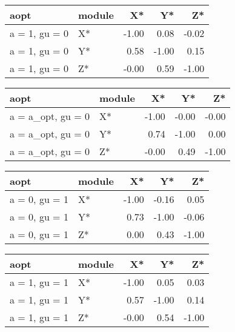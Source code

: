 \documentclass[10pt,a4paper]{article}
\begin{document}
\begin{table}[ht]
\centering
\begin{tabular}{llrrr}
  \hline
aopt & module & X* & Y* & Z* \\ 
  \hline
a = 1, gu = 0 & X* & -1.00 & 0.08 & -0.02 \\ 
  a = 1, gu = 0 & Y* & 0.58 & -1.00 & 0.15 \\ 
  a = 1, gu = 0 & Z* & -0.00 & 0.59 & -1.00 \\ 
   \hline
\end{tabular}
\end{table}


\begin{table}[ht]
\centering
\begin{tabular}{llrrr}
  \hline
aopt & module & X* & Y* & Z* \\ 
  \hline
a = a\_opt, gu = 0 & X* & -1.00 & -0.00 & -0.00 \\ 
  a = a\_opt, gu = 0 & Y* & 0.74 & -1.00 & 0.00 \\ 
  a = a\_opt, gu = 0 & Z* & -0.00 & 0.49 & -1.00 \\ 
   \hline
\end{tabular}
\end{table}


\begin{table}[ht]
\centering
\begin{tabular}{llrrr}
  \hline
aopt & module & X* & Y* & Z* \\ 
  \hline
a = 0, gu = 1 & X* & -1.00 & -0.16 & 0.05 \\ 
  a = 0, gu = 1 & Y* & 0.73 & -1.00 & -0.06 \\ 
  a = 0, gu = 1 & Z* & 0.00 & 0.43 & -1.00 \\ 
   \hline
\end{tabular}
\end{table}


\begin{table}[ht]
\centering
\begin{tabular}{llrrr}
  \hline
aopt & module & X* & Y* & Z* \\ 
  \hline
a = 1, gu = 1 & X* & -1.00 & 0.05 & 0.03 \\ 
  a = 1, gu = 1 & Y* & 0.57 & -1.00 & 0.14 \\ 
  a = 1, gu = 1 & Z* & -0.00 & 0.54 & -1.00 \\ 
   \hline
\end{tabular}
\end{table}
\end{document}

